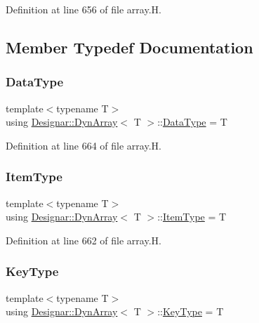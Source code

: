 Definition at line 656 of file array.\+H.



\subsection{Member Typedef Documentation}
\mbox{\label{class_designar_1_1_dyn_array_aa683f9cc296f4597784541837e234d83}} 
\subsubsection{\texorpdfstring{Data\+Type}{DataType}}
{\footnotesize\ttfamily template$<$typename T$>$ \\
using \hyperlink{class_designar_1_1_dyn_array}{Designar\+::\+Dyn\+Array}$<$ T $>$\+::\hyperlink{class_designar_1_1_fixed_array_a3e37931b909b840cb7a40fc73f12bcf5}{Data\+Type} =  T}



Definition at line 664 of file array.\+H.

\mbox{\label{class_designar_1_1_dyn_array_af4ff8919b3ae0778aa749130ee0e35f7}} 
\subsubsection{\texorpdfstring{Item\+Type}{ItemType}}
{\footnotesize\ttfamily template$<$typename T$>$ \\
using \hyperlink{class_designar_1_1_dyn_array}{Designar\+::\+Dyn\+Array}$<$ T $>$\+::\hyperlink{class_designar_1_1_fixed_array_abfeb4e683cee75ae782ad20294c4c808}{Item\+Type} =  T}



Definition at line 662 of file array.\+H.

\mbox{\label{class_designar_1_1_dyn_array_a80080a85ac9ccbe95c17bc0c665e70b4}} 
\subsubsection{\texorpdfstring{Key\+Type}{KeyType}}
{\footnotesize\ttfamily template$<$typename T$>$ \\
using \hyperlink{class_designar_1_1_dyn_array}{Designar\+::\+Dyn\+Array}$<$ T $>$\+::\hyperlink{class_designar_1_1_fixed_array_a3a725cf21783340b8aca29dd1db0acf0}{Key\+Type} =  T}



